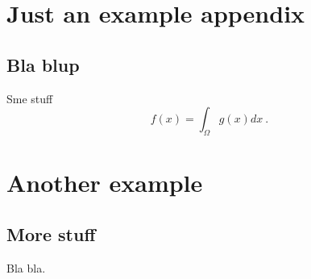 

\begin{appendix}

\chapter{Just an example appendix}
\label{app_ex1}


\section{Bla blup}

Sme stuff
\begin{equation}
	f(x) = \int_{\Omega} g(x) dx \ .
\end{equation}

\chapter{Another example}
\label{app_ex2}


\section{More stuff}

Bla bla.

\end{appendix}